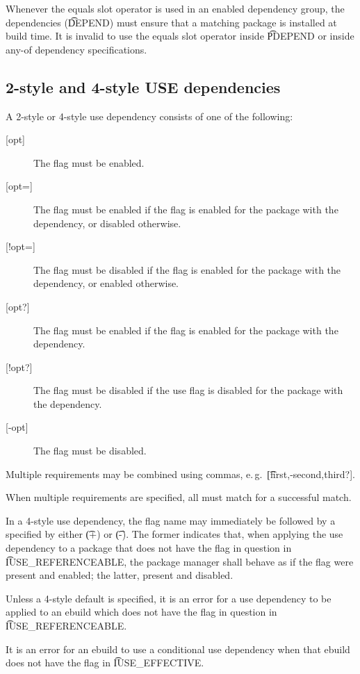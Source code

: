 Whenever the equals slot operator is used in an enabled dependency group, the dependencies
(\t{DEPEND}) must ensure that a matching package is installed at build time. It is invalid to use
the equals slot operator inside \t{PDEPEND} or inside any-of dependency specifications.

\subsection{2-style and 4-style USE dependencies}
\label{sec:use-dep}

A 2-style or 4-style use dependency consists of one of the following:

\begin{description}
\item[{[opt]}] The flag must be enabled.
\item[{[opt=]}] The flag must be enabled if the flag is enabled for the package with the
    dependency, or disabled otherwise.
\item[{[!opt=]}] The flag must be disabled if the flag is enabled for the package with the
    dependency, or enabled otherwise.
\item[{[opt?]}] The flag must be enabled if the flag is enabled for the package with the
    dependency.
\item[{[!opt?]}] The flag must be disabled if the use flag is disabled for the package with the
    dependency.
\item[{[-opt]}] The flag must be disabled.
\end{description}

Multiple requirements may be combined using commas, e.\,g.\ \t{[first,-second,third?]}.

When multiple requirements are specified, all must match for a successful match.

 In a 4-style use dependency, the flag name may immediately be
followed by a  specified by either \t{(+)} or \t{(-)}. The former indicates that, when
applying the use dependency to a package that does not have the flag in question in
\t{IUSE_REFERENCEABLE}, the package manager shall behave as if the flag were present and enabled;
the latter, present and disabled.

Unless a 4-style default is specified, it is an error for a use dependency to be applied to an
ebuild which does not have the flag in question in \t{IUSE_REFERENCEABLE}.


It is an error for an ebuild to use a conditional use dependency when that ebuild does not have the
flag in \t{IUSE_EFFECTIVE}.


